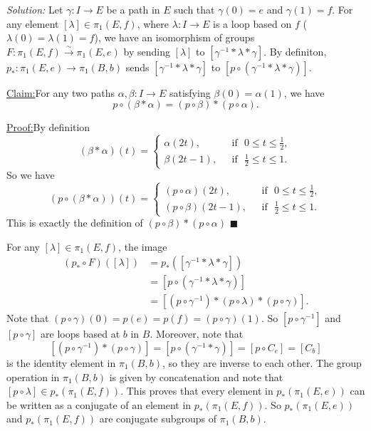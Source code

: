 \documentclass[a4paper, 12pt]{article}
\newenvironment{solution}
    {\textit{Solution:}}
    {}
\newenvironment{claim}[1]{\par\noindent\underline{Claim:}\space#1}{}
\newenvironment{claimproof}[1]{\par\noindent\underline{Proof:}\space#1}{\hfill $\blacksquare$}
\newcommand{\iif}{\ \ \ \text{if}\ \ \ }
\begin{document}
\begin{solution}
Let \(\gamma:I\rightarrow E\) be a path in \(E\) such that \(\gamma(0)=e\) and \(\gamma(1)=f\). For any element \([\lambda]\in \pi_1(E,f)\), where \(\lambda:I\rightarrow E\) is a loop based on \(f\) (\(\lambda(0)=\lambda(1)=f\)), we have an isomorphism of groups 
\(F:\pi_1(E,f)\xrightarrow{\sim}\pi_1(E,e)\) by sending \([\lambda]\) to \([\gamma^{-1}*\lambda*\gamma]\). By definiton, \(p_*:\pi_1(E,e)\rightarrow \pi_1(B,b)\) sends \([\gamma^{-1}*\lambda*\gamma]\) to \([p\circ(\gamma^{-1}* \lambda*\gamma)]\). 
\begin{claim}
For any two paths \(\alpha,\beta:I\rightarrow E\) satisfying \(\beta(0)=\alpha(1)\), we have 
\[p\circ (\beta*\alpha)=(p\circ \beta)*(p\circ \alpha).\]
\end{claim}
\begin{claimproof}
By definition 
\[(\beta*\alpha)(t)=\begin{cases}
	\alpha(2t),&\iif 0\leq t\leq \frac{1}{2},\\ 
	\beta(2t-1),&\iif \frac{1}{2}\leq t\leq 1.
\end{cases}\]
So we have 
\[(p\circ (\beta*\alpha))(t)=\begin{cases}
	(p\circ \alpha)(2t),&\iif 0\leq t\leq \frac{1}{2},\\ 
	(p\circ \beta)(2t-1),&\iif \frac{1}{2}\leq t\leq 1.
\end{cases}\]
This is exactly the definition of \((p\circ \beta)*(p\circ \alpha)\)
\end{claimproof}

For any \([\lambda]\in \pi_1(E,f)\), the image 
\begin{align*}
(p_*\circ F)([\lambda])&=p_*([\gamma^{-1}*\lambda*\gamma])\\ 
                       &=[p\circ (\gamma^{-1}*\lambda*\gamma)]\\ 
					   &=[(p\circ \gamma^{-1})*(p\circ \lambda)*(p\circ \gamma)].
\end{align*}
Note that \((p\circ \gamma)(0)=p(e)=p(f)=(p\circ \gamma)(1)\). So \([p\circ \gamma^{-1}]\) and \([p\circ \gamma]\) are loops based at \(b\) in \(B\). Moreover, note that 
\[[(p\circ \gamma^{-1})*(p\circ \gamma)]=[p\circ (\gamma^{-1}*\gamma)]=[p\circ C_e]=[C_b]\]
is the identity element in \(\pi_1(B,b)\), so they are inverse to each other. The group operation in \(\pi_1(B,b)\) is given by concatenation and note that \([p\circ \lambda]\in p_*(\pi_1(E,f))\). This proves that every element 
in \(p_*(\pi_1(E,e))\) can be written as a conjugate of an element in \(p_*(\pi_1(E,f))\). So \(p_*(\pi_1(E,e))\) and \(p_*(\pi_1(E,f))\) are conjugate subgroups of \(\pi_1(B,b)\). 
\end{solution}
\end{document}
